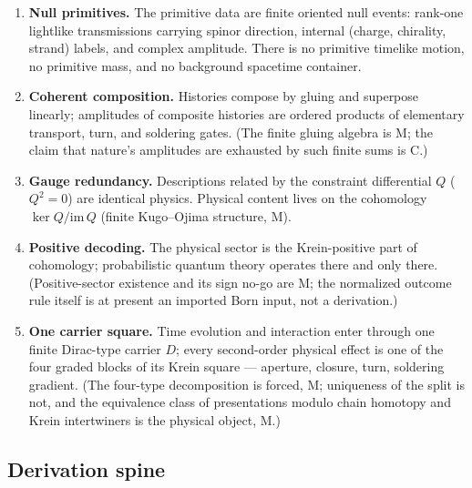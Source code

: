 \documentclass[11pt]{article}
\newcommand{\Mtag}{\textcolor{verified}{\textsc{M}}}
\newcommand{\Ctag}{\textcolor{conjectural}{\textsc{C}}}
\begin{document}
\begin{enumerate}[label=\textbf{P\arabic*.},leftmargin=2.2em]
  \item \textbf{Null primitives.}  The primitive data are finite oriented null
  events: rank-one lightlike transmissions carrying spinor direction, internal
  (charge, chirality, strand) labels, and complex amplitude.  There is no
  primitive timelike motion, no primitive mass, and no background spacetime
  container.
  \item \textbf{Coherent composition.}  Histories compose by gluing and
  superpose linearly; amplitudes of composite histories are ordered products
  of elementary transport, turn, and soldering gates.  (The finite gluing
  algebra is \Mtag; the claim that nature's amplitudes are exhausted by such
  finite sums is \Ctag.)
  \item \textbf{Gauge redundancy.}  Descriptions related by the constraint
  differential $Q$ ($Q^2=0$) are identical physics.  Physical content lives on
  the cohomology $\ker Q/\mathrm{im}\,Q$ (finite Kugo--Ojima structure,
  \Mtag).
  \item \textbf{Positive decoding.}  The physical sector is the
  Krein-positive part of cohomology; probabilistic quantum theory operates
  there and only there.  (Positive-sector existence and its sign no-go are
  \Mtag; the normalized outcome rule itself is at present an imported Born
  input, not a derivation.)
  \item \textbf{One carrier square.}  Time evolution and interaction enter
  through one finite Dirac-type carrier $D$; every second-order physical
  effect is one of the four graded blocks of its Krein square --- aperture,
  closure, turn, soldering gradient.  (The four-type decomposition is forced,
  \Mtag; uniqueness of the split is not, and the equivalence class of
  presentations modulo chain homotopy and Krein intertwiners is the physical
  object, \Mtag.)
\end{enumerate}

\subsection{Derivation spine}
\end{document}
